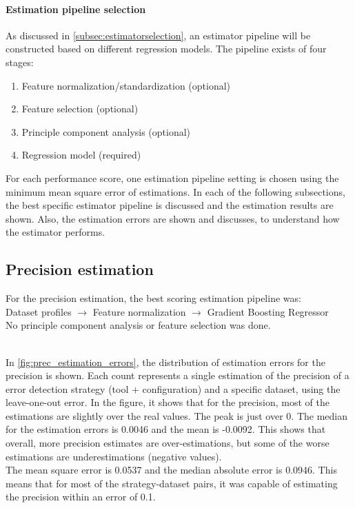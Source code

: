 \paragraph{Estimation pipeline selection} As discussed in \autoref{subsec:estimatorselection}, an estimator pipeline will be constructed based on different regression models. The pipeline exists of four stages:
\begin{enumerate}
    \item Feature normalization/standardization (optional)
    \item Feature selection (optional)
    \item Principle component analysis (optional)
    \item Regression model (required)
\end{enumerate}

For each performance score, one estimation pipeline setting is chosen using the minimum mean square error of estimations. In each of the following subsections, the best specific estimator pipeline is discussed and the estimation results are shown. Also, the estimation errors are shown and discusses, to understand how the estimator performs.

\subsection{Precision estimation}
For the precision estimation, the best scoring estimation pipeline was:
~\\Dataset profiles $\rightarrow$ Feature normalization $\rightarrow$ Gradient Boosting Regressor
\\No principle component analysis or feature selection was done. 

~\\In \autoref{fig:prec_estimation_errors}, the distribution of estimation errors for the precision is shown. Each count represents a single estimation of the precision of a error detection strategy (tool + configuration) and a specific dataset, using the leave-one-out error. In the figure, it shows that for the precision, most of the estimations are slightly over the real values. The peak is just over 0. The median for the estimation errors is 0.0046 and the mean is -0.0092. This shows that overall, more precision estimates are over-estimations, but some of the worse estimations are underestimations (negative values). 
~\\The mean square error is 0.0537 and the median absolute error is 0.0946. This means that for most of the strategy-dataset pairs, it was capable of estimating the precision within an error of 0.1. 

